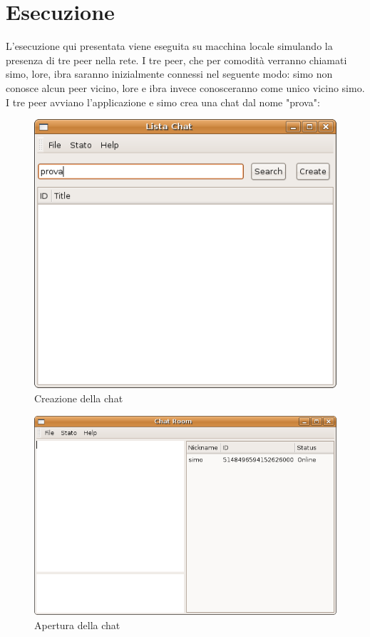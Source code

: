 \section{Esecuzione}
L'esecuzione qui presentata viene eseguita su macchina locale simulando la presenza di tre peer nella rete. I tre peer, che per comodità verranno chiamati simo, lore, ibra saranno inizialmente connessi nel seguente modo: simo non conosce alcun peer vicino, lore e ibra invece conosceranno come unico vicino simo. I tre peer avviano l'applicazione e simo crea una chat dal nome "prova":
\begin{figure}[H]
\begin{center}
\includegraphics[scale=0.5]{etc/crea_chat.png}
\caption{Creazione della chat}
\label{crea\_chat}
\end{center}
\end{figure}
\begin{figure}[H]
\begin{center}
\includegraphics[scale=0.5]{etc/apertura_chat.png}
\caption{Apertura della chat}
\label{apertura\_chat}
\end{center}
\end{figure}
